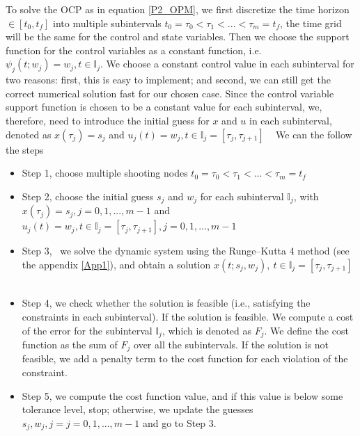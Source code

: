 \documentclass  [
  paper    = a4,
  BCOR     = 10mm,
  twoside,
  fontsize = 12pt,
  fleqn,
  toc      = bibnumbered,
  toc      = listofnumbered,
  numbers  = noendperiod,
  headings = normal,
  listof   = leveldown,
  version  = 3.03
]                                       {scrreprt}
\newcommand{\<}{\langle}
\renewcommand{\>}{\rangle}
\begin{document}
To solve the OCP as in equation \ref{P2_OPM}, we first discretize the time horizon $ \in [t_0, t_f]$ into multiple subintervals $t_0 = \tau_0 < \tau_1 < ... < \tau_m = t_f$, the time grid will be the same for the control and state variables. Then we choose the support function for the control variables as a constant function, i.e. $ \psi_j(t;w_j)= w_j, t \in \mathbb{I}_j$. We choose a constant control value in each subinterval for two reasons: first, this is easy to implement; and second, we can still get the correct numerical solution fast for our chosen case. Since the control variable support function is chosen to be a constant value for each subinterval, we, therefore, need to introduce the initial guess for $x$ and $u$ in each subinterval, denoted as $x(\tau_j) = s_j$ and $u_j(t) = w_j, t \in \mathbb{I}_j = [\tau_j, \tau_{j+1}]$   %
We can the follow the steps
\begin{itemize}
	\item Step 1, choose multiple shooting nodes $t_0 = \tau_0 < \tau_1 < ... < \tau_m = t_f$ 
	\item Step 2, choose the initial guess $s_j$ and $w_j$ for each subinterval $\mathbb{I}_j$, with $x(\tau_j) = s_j, j = 0, 1, ..., m-1$ and $u_j(t) = w_j, t \in \mathbb{I}_j = [\tau_j, \tau_{j+1}], j =0, 1, ..., m-1$ 
	\item Step 3,  we solve the dynamic system using the Runge–Kutta 4 method (see the appendix \ref{App1}), and obtain a solution $x(t; s_j, w_j), \ t  \in \mathbb{I}_j =[\tau_j, \tau_{j+1}]$  
	\item Step 4, we check whether the solution is feasible (i.e., satisfying the constraints in each subinterval). If the solution is feasible. We compute a cost of the error for the subinterval $\mathbb{I}_j$, which is denoted as $F_j$. We define the cost function as the sum of $F_j$ over all the subintervals. If the solution is not feasible, we add a penalty term to the cost function for each violation of the constraint. 
	\item Step 5, we compute the cost function value, and if this value is below some tolerance level, stop; otherwise, we update the guesses $s_j, w_j, j = j =0, 1, ..., m-1$ and go to Step 3.
\end{itemize}
\end{document}
